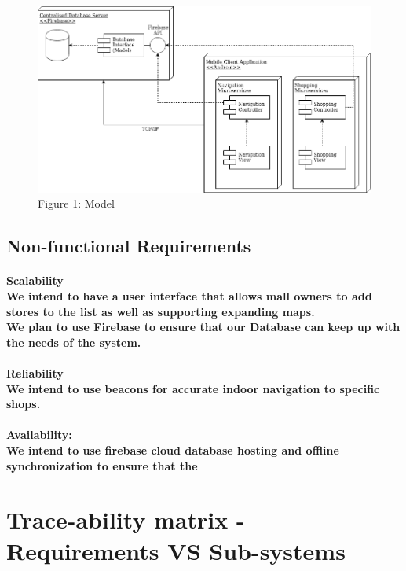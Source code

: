 \documentclass{article}
\begin{document}
\begin{figure}
    \includegraphics[width=.6\textwidth,left]{deployment_diagram.png}
    \caption{Figure 1: Model}
\end{figure}
\break

\subsection{Non-functional Requirements}
\paragraph{Scalability \\We intend to have a user interface that allows mall owners to add stores to the list as well as supporting expanding maps. \\We plan to use Firebase to ensure that our Database can keep up with the needs of the system.}
\paragraph{ Reliability \\ We intend to use beacons for accurate indoor navigation to specific shops.}
\paragraph{ Availability: \\ We intend to use firebase cloud database hosting and offline synchronization to ensure that the}
    


\section{Trace-ability matrix - Requirements VS Sub-systems}
\end{document}
